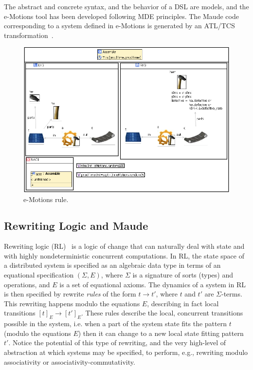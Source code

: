 The abstract and concrete syntax, and the behavior of a DSL are models, and the e-Motions tool has been developed following MDE principles. The Maude code corresponding to a system defined in e-Motions is generated by an ATL/TCS transformation~\cite{ATL}.

\begin{figure}[htp]
  \centering
  \includegraphics[width=\textwidth]{imgs/assemble}
  \caption{e-Motions  rule.}\label{fig:assemble}
\end{figure}

\subsection{Rewriting Logic and Maude}

Rewriting logic (RL)~\cite{Meseguer:92-tcs} is a logic of change
that can naturally deal with state and with highly nondeterministic
concurrent computations.
In RL,  the state space of a distributed system is specified as an
algebraic data type in terms of an equational specification
$(\Sigma,E)$, where $\Sigma$ is a signature of sorts (types) and
operations, and $E$ is a set of equational axioms. The dynamics of a
system in RL is then specified by rewrite \emph{rules} of the form
$t \rightarrow t'$, where $t$ and $t'$ are $\Sigma$-terms.
This rewriting happens modulo the equations $E$, describing in fact
local transitions $[t]_E\rightarrow[t']_E$.
These rules describe the local, concurrent transitions possible in the
system, i.e. when a part of the system state fits the pattern $t$
(modulo the equations $E$)
then it can change to a new local state fitting pattern $t'$.
Notice the potential of this type of rewriting, and the very high-level of
abstraction at which systems may be specified, to perform, e.g.,
rewriting modulo associativity or associativity-commutativity.

